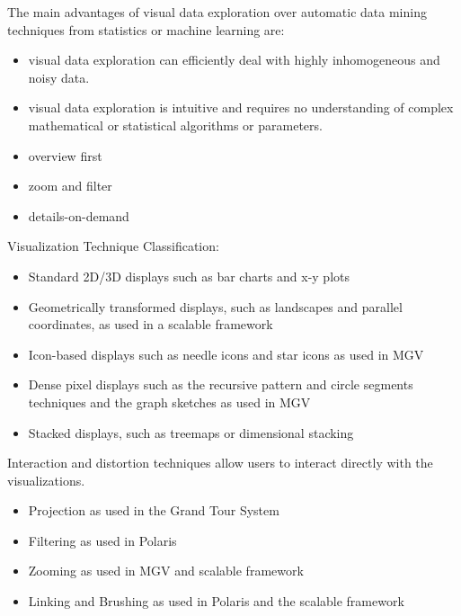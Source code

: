 \documentclass[
]{article}
\providecommand{\tightlist}{%
  \setlength{\itemsep}{0pt}\setlength{\parskip}{0pt}}
\begin{document}
The main advantages of visual data exploration over automatic data
mining techniques from statistics or machine learning are:

\begin{itemize}
\tightlist
\item
  visual data exploration can efficiently deal with highly inhomogeneous
  and noisy data.
\item
  visual data exploration is intuitive and requires no understanding of
  complex mathematical or statistical algorithms or parameters.
\end{itemize}


\begin{itemize}
\tightlist
\item
  overview first
\item
  zoom and filter
\item
  details-on-demand
\end{itemize}


Visualization Technique Classification:

\begin{itemize}
\tightlist
\item
  Standard 2D/3D displays such as bar charts and x-y plots
\item
  Geometrically transformed displays, such as landscapes and parallel
  coordinates, as used in a scalable framework
\item
  Icon-based displays such as needle icons and star icons as used in MGV
\item
  Dense pixel displays such as the recursive pattern and circle segments
  techniques and the graph sketches as used in MGV
\item
  Stacked displays, such as treemaps or dimensional stacking
\end{itemize}

Interaction and distortion techniques allow users to interact directly
with the visualizations.

\begin{itemize}
\tightlist
\item
  Projection as used in the Grand Tour System
\item
  Filtering as used in Polaris
\item
  Zooming as used in MGV and scalable framework
\item
  Linking and Brushing as used in Polaris and the scalable framework
\end{itemize}
\end{document}
